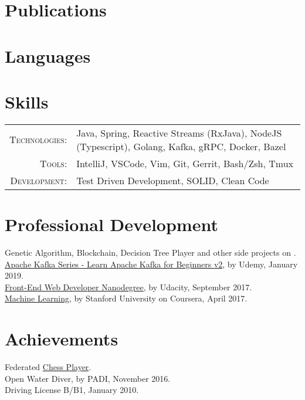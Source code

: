 \section{Publications}

\newpage

\section{Languages}

\section{Skills}
\begin{tabular}{r p{12.5cm}}
\textsc{Technologies:} & Java, Spring, Reactive Streams (RxJava), NodeJS (Typescript), Golang, Kafka, gRPC, Docker, Bazel\\
\textsc{Tools:} & IntelliJ, VSCode, Vim, Git, Gerrit, Bash/Zsh, Tmux\\
\textsc{Development:} & Test Driven Development, SOLID, Clean Code
\end{tabular}

\section{Professional Development}
\noindent
\bulletS Genetic Algorithm, Blockchain, Decision Tree Player and other side projects on \gitHubNoUrl{}.\\
\bulletS \href{https://brunoroque06.github.io/documents/certificates/KafkaUdemy.pdf}{Apache Kafka Series - Learn Apache Kafka for Beginners v2}, by Udemy, January 2019.\\
\bulletS \href{https://brunoroque06.github.io/documents/certificates/FrontEndUdacity.pdf}{Front-End Web Developer Nanodegree}, by Udacity, September 2017.\\
\bulletS \href{https://brunoroque06.github.io/documents/certificates/MachineLearningCoursera.pdf}{Machine Learning}, by Stanford University on Coursera, April 2017. %

\section{Achievements}
\noindent
\bulletS Federated \href{http://ratings.fide.com/card.phtml?event=1958720}{Chess Player}.\\
\bulletS Open Water Diver, by PADI, November 2016.\\
\bulletS Driving License B/B1, January 2010.
